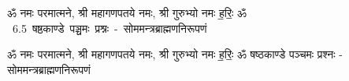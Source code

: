 \documentclass[17pt]{extarticle}
\begin{document}
\begin{titlepage}
    \begin{center}
 
\begin{sanskrit}
    { \Large
    ॐ नमः परमात्मने, श्री महागणपतये नमः, श्री गुरुभ्यो नमः
ह॒रिः॒ ॐ 
    }
    \\
    \vspace{2.5cm}
    \mbox{ \Huge
    6.5      षष्ठकाण्डे पञ्चमः प्रश्नः - सोममन्त्रब्राह्मणनिरूपणं   }
\end{sanskrit}
\end{center}

\end{titlepage}
\tableofcontents

ॐ नमः परमात्मने, श्री महागणपतये नमः, श्री गुरुभ्यो नमः
ह॒रिः॒ ॐ       षष्ठकाण्डे पञ्चमः प्रश्नः - सोममन्त्रब्राह्मणनिरूपणं \newline

\end{document}
